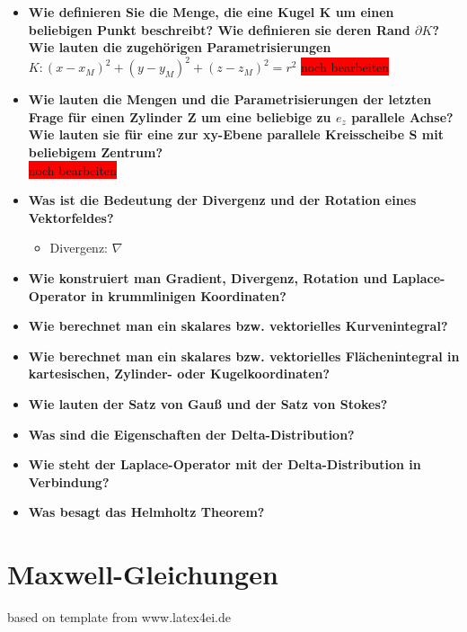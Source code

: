 \documentclass[german]{latex4ei/latex4ei_sheet}
\begin{document}
\begin{sectionbox}
\begin{itemize}
		\item \textbf{Wie definieren Sie die Menge, die eine Kugel K um einen\\
		 beliebigen Punkt beschreibt? Wie definieren sie deren Rand $\partial K$? Wie lauten die zugehörigen Parametrisierungen}\\
		$K: (x−x_M)^2+(y−y_M)^2+(z−z_M)^2=r^2$
		\colorbox{red}{noch bearbeiten}
		\item \textbf{Wie lauten die Mengen und die Parametrisierungen der letzten Frage für einen Zylinder Z um eine beliebige zu $e_z$ parallele Achse? Wie lauten sie für eine zur xy-Ebene parallele Kreisscheibe S mit beliebigem Zentrum?}\\
		\colorbox{red}{noch bearbeiten}
		\item \textbf{Was ist die Bedeutung der Divergenz und der Rotation eines Vektorfeldes?}
			\begin{itemize}
				\item Divergenz: $\nabla$
			\end{itemize}
		\item \textbf{Wie konstruiert man Gradient, Divergenz, Rotation und Laplace-Operator in
krummlinigen Koordinaten?}
		\item \textbf{Wie berechnet man ein skalares bzw. vektorielles Kurvenintegral?}
		\item \textbf{Wie berechnet man ein skalares bzw. vektorielles Flächenintegral in kartesischen, Zylinder- oder Kugelkoordinaten?}
		\item \textbf{Wie lauten der Satz von Gauß und der Satz von Stokes?}
		\item \textbf{Was sind die Eigenschaften der Delta-Distribution?}
		\item \textbf{Wie steht der Laplace-Operator mit der Delta-Distribution in Verbindung?}
		\item \textbf{Was besagt das Helmholtz Theorem?}
	\end{itemize}	
\end{sectionbox}
\section{Maxwell-Gleichungen}
\tiny{based on template from www.latex4ei.de}
\end{document}
